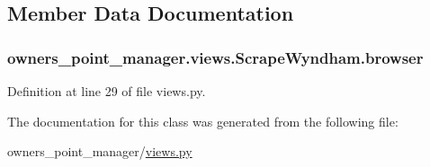 \subsection{Member Data Documentation}
\hypertarget{classowners__point__manager_1_1views_1_1ScrapeWyndham_a8b85e4b79c90e57bf39a394fedcd51ec}{
\subsubsection[{browser}]{\setlength{\rightskip}{0pt plus 5cm}owners\-\_\-point\-\_\-manager.\-views.\-Scrape\-Wyndham.\-browser}}\label{classowners__point__manager_1_1views_1_1ScrapeWyndham_a8b85e4b79c90e57bf39a394fedcd51ec}


Definition at line 29 of file views.\-py.



The documentation for this class was generated from the following file\-:\begin{DoxyCompactItemize}
\item 
owners\-\_\-point\-\_\-manager/\hyperlink{owners__point__manager_2views_8py}{views.\-py}\end{DoxyCompactItemize}
